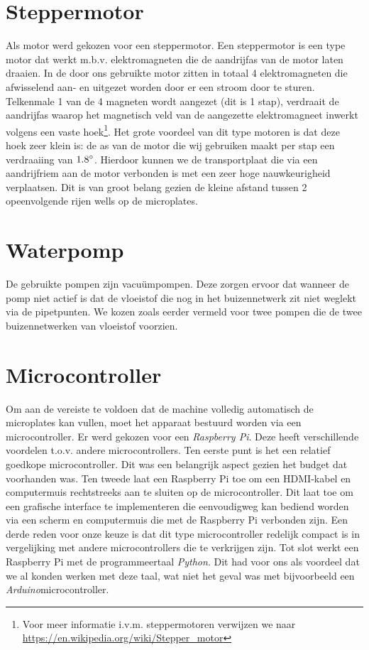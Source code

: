 \documentclass[a4paper,twoside,kulak]{kulakreport} %
\begin{document}
\section{Steppermotor}

Als motor werd gekozen voor een steppermotor. Een steppermotor is een type motor dat werkt m.b.v. elektromagneten die de aandrijfas van de motor laten draaien. In de door ons gebruikte motor zitten in totaal 4 elektromagneten die afwisselend aan- en uitgezet worden door er een stroom door te sturen. Telkenmale 1 van de 4 magneten wordt aangezet (dit is 1 stap), verdraait de aandrijfas waarop het magnetisch veld van de aangezette elektromagneet inwerkt volgens een vaste hoek\footnote{Voor meer informatie i.v.m. steppermotoren verwijzen we naar \url{https://en.wikipedia.org/wiki/Stepper_motor}}. Het grote voordeel van dit type motoren is dat deze hoek zeer klein is: de as van de motor die wij gebruiken maakt per stap een verdraaiing van $1.8\degree$. Hierdoor kunnen we de transportplaat die via een aandrijfriem aan de motor verbonden is met een zeer hoge nauwkeurigheid verplaatsen. Dit is van groot belang gezien de kleine afstand tussen 2 opeenvolgende rijen wells op de microplates. 

\section{Waterpomp}

De gebruikte pompen zijn vacuümpompen. Deze zorgen ervoor dat wanneer de pomp niet actief is dat de vloeistof die nog in het buizennetwerk zit niet weglekt via de pipetpunten. We kozen zoals eerder vermeld voor twee pompen die de twee buizennetwerken van vloeistof voorzien. 

\section{Microcontroller}

Om aan de vereiste te voldoen dat de machine volledig automatisch de microplates kan vullen, moet het apparaat bestuurd worden via een microcontroller. Er werd gekozen voor een \textit{Raspberry Pi}. Deze heeft verschillende voordelen t.o.v. andere microcontrollers. Ten eerste punt is het een relatief goedkope microcontroller. Dit was een belangrijk aspect gezien het budget dat voorhanden was. Ten tweede laat een Raspberry Pi toe om een HDMI-kabel en computermuis rechtstreeks aan te sluiten op de microcontroller. Dit laat toe om een grafische interface te implementeren die eenvoudigweg kan bediend worden via een scherm en computermuis die met de Raspberry Pi verbonden zijn. Een derde reden voor onze keuze is dat dit type microcontroller redelijk compact is in vergelijking met andere microcontrollers die te verkrijgen zijn. Tot slot werkt een Raspberry Pi met de programmeertaal \textit{Python}. Dit had voor ons als voordeel dat we al konden werken met deze taal, wat niet het geval was met bijvoorbeeld een \textit{Arduino}microcontroller. 
\end{document}
